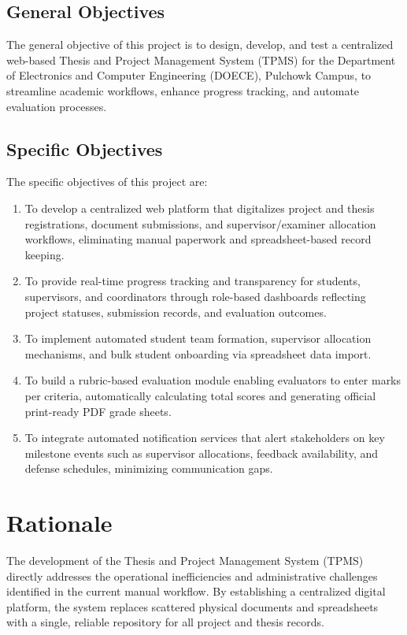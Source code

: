 \documentclass[12pt,a4paper]{report}
\begin{document}
\subsection{General Objectives}
The general objective of this project is to design, develop, and test a centralized web-based Thesis and Project Management System (TPMS) for the Department of Electronics and Computer Engineering (DOECE), Pulchowk Campus, to streamline academic workflows, enhance progress tracking, and automate evaluation processes.

\subsection{Specific Objectives}
The specific objectives of this project are:
\begin{enumerate}
  \item To develop a centralized web platform that digitalizes project and thesis registrations, document submissions, and supervisor/examiner allocation workflows, eliminating manual paperwork and spreadsheet-based record keeping.
  
  \item To provide real-time progress tracking and transparency for students, supervisors, and coordinators through role-based dashboards reflecting project statuses, submission records, and evaluation outcomes.
  
  \item To implement automated student team formation, supervisor allocation mechanisms, and bulk student onboarding via spreadsheet data import.
  
  \item To build a rubric-based evaluation module enabling evaluators to enter marks per criteria, automatically calculating total scores and generating official print-ready PDF grade sheets.
  
  \item To integrate automated notification services that alert stakeholders on key milestone events such as supervisor allocations, feedback availability, and defense schedules, minimizing communication gaps.
\end{enumerate}

\section{Rationale}
The development of the Thesis and Project Management System (TPMS) directly addresses the operational inefficiencies and administrative challenges identified in the current manual workflow. By establishing a centralized digital platform, the system replaces scattered physical documents and spreadsheets with a single, reliable repository for all project and thesis records.
\end{document}
